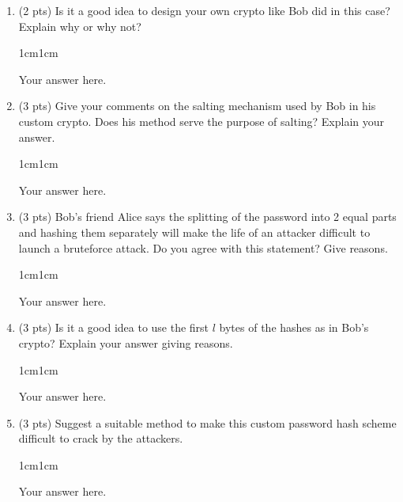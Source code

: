 \documentclass[11pt,letterpaper]{article}
\newenvironment{answer}{\em \color{blue} \begin{adjustwidth}{1cm}{1cm}}{\end{adjustwidth}}
\begin{document}
	
	\begin{enumerate}
		
		\item (2 pts) Is it a good idea to design your own crypto like Bob did in this case? Explain why or why not?
		
		\begin{answer}
			
			Your answer here.
			
		\end{answer}
		
		\item (3 pts) Give your comments on the salting mechanism used by Bob in his custom crypto. Does his method serve the purpose of salting? Explain your answer.
		
		\begin{answer}
			
			Your answer here.
			
		\end{answer}
		
		\item (3 pts)  Bob’s friend Alice says the splitting of the password into 2 equal parts and hashing them separately will make the life of an attacker difficult to launch a bruteforce attack. Do you agree with this statement? Give reasons.
		
		\begin{answer}
			
			Your answer here.
			
		\end{answer}
		
		\item (3 pts)  Is it a good idea to use the first $l$ bytes of the hashes as in Bob's crypto? Explain your answer giving reasons.
		
		\begin{answer}
			
			Your answer here.
			
		\end{answer}
		
		\item (3 pts) Suggest a suitable method to make this custom password hash scheme difficult to crack by the attackers.  
		
		\begin{answer}
			
			Your answer here.
			

\end{answer}
\end{enumerate}
\end{document}
